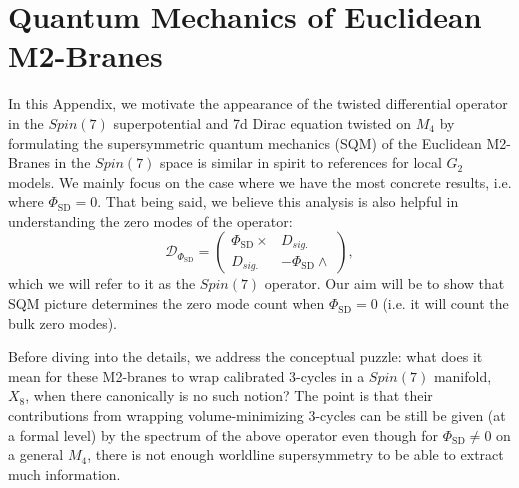 \documentclass[12pt]{article}%
\numberwithin{equation}{section}
\renewcommand{\(}{\left(}
\renewcommand{\)}{\right)}
\renewcommand{\[}{\left[}
\renewcommand{\]}{\right]}
\begin{document}
\section{Quantum Mechanics of Euclidean M2-Branes}\label{app:SQM}
In this Appendix, we motivate the appearance of the twisted differential operator in the $Spin(7)$ superpotential and 7d Dirac equation twisted on $M_4$ by formulating the supersymmetric quantum mechanics (SQM) of the Euclidean M2-Branes in the $Spin(7)$ space is similar in spirit to references \cite{Pantev:2009de, Braun:2018vhk, Hubner:2020yde} for local $G_2$ models. We mainly focus on the case where we have the most concrete results, i.e. where $\Phi_{\mathrm{SD}}=0$. That being said, we believe this analysis is also helpful in understanding the zero modes of the operator:
\begin{equation}
\mathcal{D}_{\Phi_{\mathrm{SD}}} = \begin{pmatrix}
\Phi_{\mathrm{SD}}\times & D_{sig.} \\
D_{sig.} & -\Phi_{\mathrm{SD}}\wedge
\end{pmatrix},
\end{equation}
which we will refer to it as the $Spin(7)$ operator. Our aim will be to show that SQM picture determines the zero mode count when $\Phi_{\mathrm{SD}}=0$ (i.e. it will count the bulk zero modes).

Before diving into the details, we address the conceptual puzzle: what does it mean for these M2-branes to wrap calibrated 3-cycles in a $Spin(7)$ manifold, $X_8$, when there canonically is no such notion? The point is that their contributions from wrapping volume-minimizing 3-cycles can be still be given (at a formal level) by the spectrum of the above operator even though for $\Phi_{\mathrm{SD}}\neq 0$ on a general $M_4$, there is  not enough worldline supersymmetry to be able to extract much information.
\end{document}
